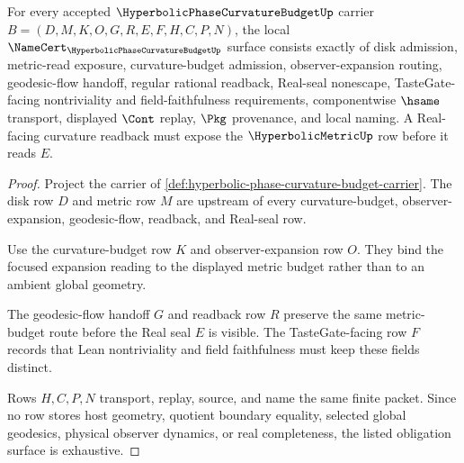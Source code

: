 \begin{theorem}
\label{thm:hyperbolic-phase-curvature-budget-namecert-obligations}
For every accepted $\HyperbolicPhaseCurvatureBudgetUp$ carrier $B=(D,M,K,O,G,R,E,F,H,C,P,N)$, the local $\NameCert_{\HyperbolicPhaseCurvatureBudgetUp}$ surface consists exactly of disk admission, metric-read exposure, curvature-budget admission, observer-expansion routing, geodesic-flow handoff, regular rational readback, Real-seal nonescape, TasteGate-facing nontriviality and field-faithfulness requirements, componentwise $\hsame$ transport, displayed $\Cont$ replay, $\Pkg$ provenance, and local naming. A Real-facing curvature readback must expose the $\HyperbolicMetricUp$ row before it reads $E$.
\end{theorem}
\begin{proof}
Project the carrier of \autoref{def:hyperbolic-phase-curvature-budget-carrier}. The disk row $D$ and metric row $M$ are upstream of every curvature-budget, observer-expansion, geodesic-flow, readback, and Real-seal row.

Use the curvature-budget row $K$ and observer-expansion row $O$. They bind the focused expansion reading to the displayed metric budget rather than to an ambient global geometry.

The geodesic-flow handoff $G$ and readback row $R$ preserve the same metric-budget route before the Real seal $E$ is visible. The TasteGate-facing row $F$ records that Lean nontriviality and field faithfulness must keep these fields distinct.

Rows $H,C,P,N$ transport, replay, source, and name the same finite packet. Since no row stores host geometry, quotient boundary equality, selected global geodesics, physical observer dynamics, or real completeness, the listed obligation surface is exhaustive.
\end{proof}


